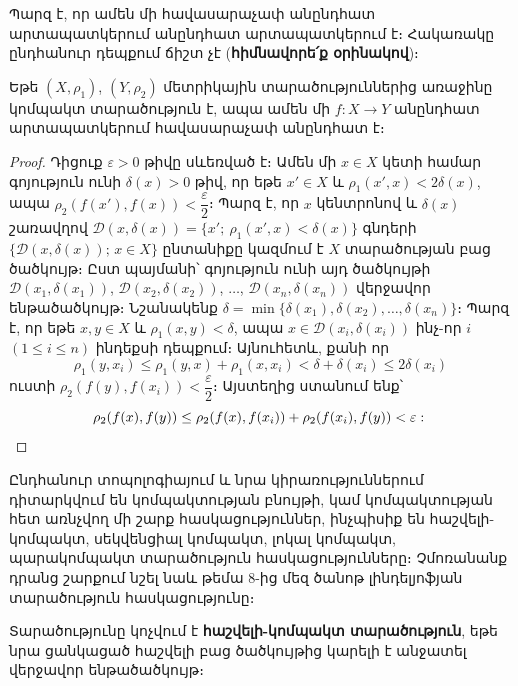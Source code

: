\documentclass[./main.tex]{subfiles}
\begin{document}
\par Պարզ է, որ ամեն մի հավասարաչափ անընդհատ արտապատկերում անընդհատ արտապատկերում է։ Հակառակը ընդհանուր դեպքում ճիշտ չէ (\textbf{հիմնավորե՛ք օրի\-նա\-կով})։

\begin{theorem}\label{ch16thm10} \label{թեորեմ 10}
Եթե $(X, \rho_1)$, $(Y, \rho_2)$ մետրիկային տարածություններից առաջինը կոմ\-պակտ տարածություն է, ապա ամեն մի $f: X \to Y$ անընդհատ արտապատկե\-րում հավասարաչափ անընդհատ է։
\end{theorem} %

\begin{proof}
Դիցուք $\varepsilon > 0$ թիվը սևեռված է։ Ամեն մի $x \in X$ կետի համար գո\-յու\-թյուն ունի $\delta(x) > 0$ թիվ, որ եթե $x' \in X$ և $\rho_1(x', x) < 2\delta(x)$, ապա $\rho_2(f(x'), f(x)) < \dfrac{\varepsilon}{2}$։ Պարզ է, որ $x$ կենտրոնով և $\delta(x)$ շառավղով $\mathcal{D}(x, \delta(x)) = \{x';\  \rho_1(x', x) < \delta(x)\}$ գնդերի $\{\mathcal{D}(x, \delta(x));\, x \in X\}$ ընտանիքը կազմում է $X$ տարածության բաց ծածկույթ։ Ըստ պայմանի՝ գոյություն ունի այդ ծածկույթի $\mathcal{D}(x_1, \delta(x_1))$, $\mathcal{D}(x_2, \delta(x_2))$, $\dots$, \linebreak $\mathcal{D}(x_n, \delta(x_n))$ վերջավոր ենթածածկույթ։ Նշանակենք $\delta = \min\{\delta(x_1), \delta(x_2), \dots, \delta(x_n)\}$։ Պարզ է, որ եթե $x, y \in X$ և $\rho_1(x, y) < \delta$, ապա $x \in \mathcal{D}(x_i, \delta(x_i))$ ինչ-որ $i$ $(1 \le i \le n)$ ինդեքսի դեպքում։ Այնուհետև, քանի որ
\[
\rho_1(y, x_i) \le \rho_1(y, x) + \rho_1(x, x_i) < \delta + \delta(x_i) \le 2\delta(x_i)
\]
ուստի $\rho_2(f(y), f(x_i)) < \dfrac{\varepsilon}{2}$։ Այստեղից ստանում ենք՝
\[
\rho_2(f(x), f(y)) \le \rho_2(f(x), f(x_i)) + \rho_2(f(x_i), f(y)) < \varepsilon: \qedhere
\]
\end{proof}

\par Ընդհանուր տոպոլոգիայում և նրա կիրառություններում դիտարկվում են կոմ\-պակ\-տության բնույթի, կամ կոմպակտության հետ առնչվող մի շարք հասկացու\-թ\-յուն\-ներ, ինչպիսիք են հաշվելի-կոմպակտ, սեկվենցիալ կոմպակտ, լոկալ կոմպակտ, պարակոմպակտ տարածություն հասկացությունները։ Չմոռանանք դրանց շարքում նշել նաև թեմա 8-ից մեզ ծանոթ լինդելյոֆյան տարածություն հասկացությունը։

\begin{definition}
Տարածությունը կոչվում է \textbf{հաշվելի-կոմպակտ տարածություն}, \linebreak եթե նրա ցանկացած հաշվելի բաց ծածկույթից կարելի է անջատել վերջավոր ենթա\-ծած\-կույթ։
\end{definition}
\end{document}
